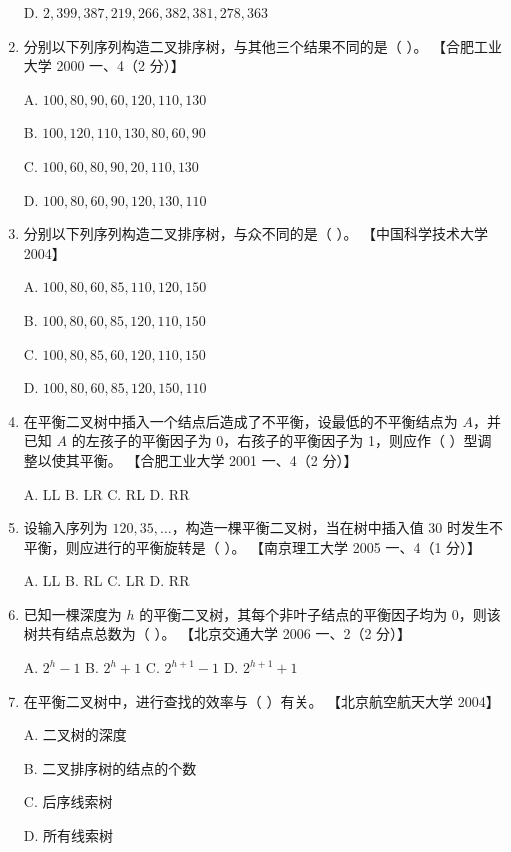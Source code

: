 \documentclass[lang=cn,newtx,10pt,scheme=chinese]{elegantbook}
\begin{document}
\begin{enumerate}
    D. $2, 399, 387, 219, 266, 382, 381, 278, 363$  

    \item 分别以下列序列构造二叉排序树，与其他三个结果不同的是（ ）。  
    【合肥工业大学 2000 一、4（2 分）】 

    A. $100, 80, 90, 60, 120, 110, 130$  

    B. $100, 120, 110, 130, 80, 60, 90$  

    C. $100, 60, 80, 90, 20, 110, 130$  

    D. $100, 80, 60, 90, 120, 130, 110$  

    \item 分别以下列序列构造二叉排序树，与众不同的是（ ）。  
    【中国科学技术大学 2004】  

    A. $100, 80, 60, 85, 110, 120, 150$  

    B. $100, 80, 60, 85, 120, 110, 150$  

    C. $100, 80, 85, 60, 120, 110, 150$  

    D. $100, 80, 60, 85, 120, 150, 110$  

    \item 在平衡二叉树中插入一个结点后造成了不平衡，设最低的不平衡结点为 $A$，并已知 $A$ 的左孩子的平衡因子为 0，右孩子的平衡因子为 1，则应作（ ）型调整以使其平衡。  
    【合肥工业大学 2001 一、4（2 分）】  

    A. LL \quad B. LR \quad C. RL \quad D. RR  

    \item 设输入序列为 $120, 35, \dots$，构造一棵平衡二叉树，当在树中插入值 30 时发生不平衡，则应进行的平衡旋转是（ ）。  
    【南京理工大学 2005 一、4（1 分）】  

    A. LL \quad B. RL \quad C. LR \quad D. RR  

    \item 已知一棵深度为 $h$ 的平衡二叉树，其每个非叶子结点的平衡因子均为 0，则该树共有结点总数为（ ）。  
    【北京交通大学 2006 一、2（2 分）】  

    A. $2^h - 1$ \quad B. $2^h + 1$ \quad C. $2^{h+1} - 1$ \quad D. $2^{h+1} + 1$  

    \item 在平衡二叉树中，进行查找的效率与（ ）有关。  
    【北京航空航天大学 2004】  

    A. 二叉树的深度  

    B. 二叉排序树的结点的个数  

    C. 后序线索树  

    D. 所有线索树  


\end{enumerate}
\end{document}
